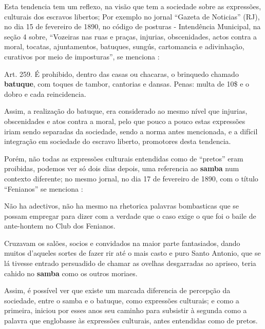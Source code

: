 Esta tendencia tem um reflexo, na visão que tem a sociedade sobre as expressões,
culturais dos escravos libertos; Por exemplo no jornal ``Gazeta de Noticias'' (RJ), 
no dia 15 de fevereiro de 1890,
no código de posturas - Intendência Municipal, 
na seção 4 sobre, 
``Vozeiras nas ruas e praças, injurias, obscenidades, 
actos contra a moral, tocatas, ajuntamentos, batuques, sungús, cartomancia e adivinhação,
curativos por meio de imposturas'', se menciona \cite[pp. 4]{batuqueperiodicogazetanoticias}:
\begin{citando}%
Art. 259. É prohibido, dentro das casas ou chacaras, o brinquedo chamado \textbf{batuque},
com toques de tambor, cantorias e dansas. Penas: multa de 10\$ e o dobro e cada reincidencia.
\end{citando}
Assim, a realização do batuque, era considerado ao mesmo nível que injurias, 
obscenidades e atos contra a moral, 
pelo que pouco a pouco estas expressões iriam sendo separadas da sociedade,
sendo a norma antes mencionada, e a difícil integração em sociedade do escravo liberto, 
promotores desta tendencia. 

Porém, não todas as expressões culturais entendidas como de ``pretos'' eram proibidas,
podemos ver só dois dias depois, uma referencia ao \textbf{samba} num contexto diferente; 
no mesmo jornal, 
no dia 17 de fevereiro de 1890, com o título ``Fenianos''
se menciona \cite[pp. 1]{batuqueperiodicogazetanoticias2}:
\begin{citando}%
Não ha adectivos, não ha mesmo na 
rhetorica palavras bombasticas que se 
possam empregar para dizer com a
verdade que o caso exige o que foi o baile
de ante-hontem no Club dos Fenianos.

Cruzavam os salões, socios e convidados
na maior parte fantasiados, dando
muitos d'aqueles sortes de fazer rir até
o mais casto e puro Santo Antonio, que se
lá tivesse entrado persuadido de chamar
as ovelhas desgarradas ao apriseo, teria
cahido no \textbf{samba} como os outros moriaes.
\end{citando}%
Assim, é possível ver que existe um marcada diferencia de percepção da sociedade, entre o samba e o batuque,
como expressões culturais; e como a primeira, 
iniciou por esses anos seu caminho para subsistir à segunda como a palavra que englobasse às
expressões culturais, antes entendidas como de pretos. 




